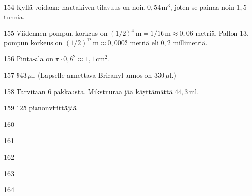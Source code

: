 \begin{Vastaus}{154}
Kyllä voidaan: hautakiven tilavuus on noin $0,54$\,m$^3$, joten se painaa noin $1,5$ tonnia.
\end{Vastaus}
\begin{Vastaus}{155}
        Viidennen pompun korkeus on $(1/2)^4\,\textrm{m}=1/16\,\textrm{m}\approx 0,06$ metriä. Pallon $13$. pompun korkeus on $(1/2)^{12}\,\textrm{m} \approx 0,0002$ metriä eli $0,2$ millimetriä.
        
\end{Vastaus}
\begin{Vastaus}{156}
        Pinta-ala on $\pi \cdot 0,6^2 \approx 1,1\,$cm$^2$.
        
\end{Vastaus}
\begin{Vastaus}{157}
$943$\,$\mu$l. (Lapselle annettava Bricanyl-annos on $330$\,$\mu$l.) %
	
\end{Vastaus}
\begin{Vastaus}{158}
Tarvitaan $6$ pakkausta. Mikstuuraa jää käyttämättä $44,3$\,ml.
 
\end{Vastaus}
\begin{Vastaus}{159}
$125$ pianonvirittäjää
	
\end{Vastaus}
\begin{Vastaus}{160}
	
\end{Vastaus}
\begin{Vastaus}{161}
	
\end{Vastaus}
\begin{Vastaus}{162}
	
\end{Vastaus}
\begin{Vastaus}{163}
	
\end{Vastaus}
\begin{Vastaus}{164}
	
\end{Vastaus}
